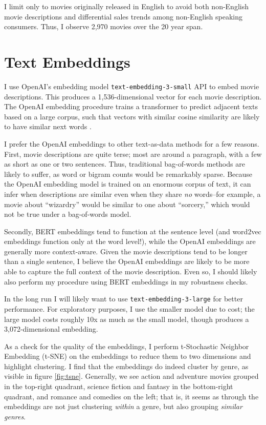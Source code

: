 \documentclass{article}
\begin{document}
I limit only to movies originally released in English to avoid both non-English movie descriptions and differential sales trends among non-English speaking consumers. Thus, I observe 2,970 movies over the 20 year span.

\section{Text Embeddings}

I use OpenAI's embedding model \texttt{text-embedding-3-small} API to embed movie descriptions. This produces a 1,536-dimensional vector for each movie description. The OpenAI embedding procedure trains a transformer to predict adjacent texts based on a large corpus, such that vectors with similar cosine similarity are likely to have similar next words \parencite{neelakantan2022ao, kusupati2022ao}.

I prefer the OpenAI embeddings to other text-as-data methods for a few reasons. First, movie descriptions are quite terse; most are around a paragraph, with a few as short as one or two sentences. Thus, traditional bag-of-words methods are likely to suffer, as word or bigram counts would be remarkably sparse. Because the OpenAI embedding model is trained on an enormous corpus of text, it can infer when descriptions are similar even when they share \emph{no} words--for example, a movie about ``wizardry'' would be similar to one about ``sorcery,'' which would not be true under a bag-of-words model.

Secondly, BERT embeddings tend to function at the sentence level (and word2vec embeddings function only at the word level!), while the OpenAI embeddings are generally more context-aware. Given the movie descriptions tend to be longer than a single sentence, I believe the OpenAI embeddings are likely to be more able to capture the full context of the movie description. Even so, I should likely also perform my procedure using BERT embeddings in my robustness checks.

In the long run I will likely want to use \texttt{text-embedding-3-large} for better performance. For exploratory purposes, I use the smaller model due to cost; the large model costs roughly 10x as much as the small model, though produces a 3,072-dimensional embedding.

As a check for the quality of the embeddings, I perform t-Stochastic Neighbor Embedding (t-SNE) on the embeddings to reduce them to two dimensions and highlight clustering. I find that the embeddings do indeed cluster by genre, as visible in figure \ref{fig:tsne}. Generally, we see action and adventure movies grouped in the top-right quadrant, science fiction and fantasy in the bottom-right quadrant, and romance and comedies on the left; that is, it seems as through the embeddings are not just clustering \emph{within} a genre, but also grouping \emph{similar genres}. 
\end{document}
